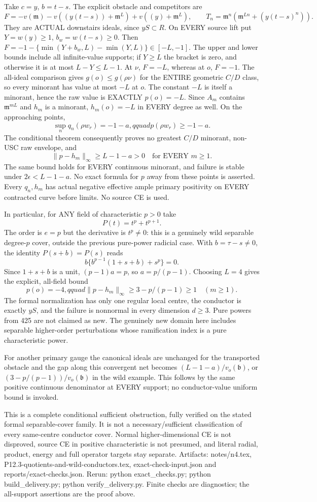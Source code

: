 Take $c=y$, $b=t-s$. The explicit obstacle and competitors are
\[
 F=-v(\mathfrak m)-v((y(t-s))+\mathfrak m^L)
       +v((y)+\mathfrak m^L),
 \qquad T_n=\mathfrak m^n(\mathfrak m^{Ln}+(y(t-s)^n)).
\]
They are ACTUAL downstairs ideals, since $yS\subset R$.
On EVERY source lift put $Y=w(y)\ge1$, $b_w=w(t-s)\ge0$.
Then $F=-1-\{\min(Y+b_w,L)-\min(Y,L)\}\in[-L,-1]$.
The upper and lower bounds include all infinite-value supports; if
$Y\ge L$ the bracket is zero, and otherwise it is at most $L-Y\le L-1$.
At $\nu$, $F=-L$, whereas at $o$, $F=-1$.
The all-ideal comparison gives $g(o)\le g(\rho\nu)$ for the ENTIRE
geometric $C/D$ class, so every minorant has value at most $-L$ at $o$.
The constant $-L$ is itself a minorant, hence the raw value is EXACTLY
$p(o)=-L$. Since $A_m$ contains $\mathfrak m^{mL}$ and $h_m$ is a minorant,
$h_m(o)=-L$ in EVERY degree as well. On the approaching points,
\[
 \sup_n q_n(\rho w_r)=-1-a,qquad p(\rho w_r)\ge-1-a.
\]
The conditional theorem consequently proves no greatest $C/D$ minorant,
non-USC raw envelope, and
\[
 \|p-h_m\|_\infty\ge L-1-a>0\quad\text{for EVERY }m\ge1.
\]
The same bound holds for EVERY continuous minorant, and failure is stable
under $2\epsilon<L-1-a$. No exact formula for $p$ away from these points
is asserted. Every $q_n,h_m$ has actual negative effective ample primary
positivity on EVERY contracted curve before limits. No source CE is used.

In particular, for ANY field of characteristic $p>0$ take
\[
 P(t)=t^p+t^{p+1}.
\]
The order is $e=p$ but the derivative is $t^p\ne0$: this is a genuinely
wild separable degree-$p$ cover, outside the previous pure-power radicial
case. With $b=\tau-s\ne0$, the identity $P(s+b)=P(s)$ reads
\[
 b\{b^{p-1}(1+s+b)+s^p\}=0.
\]
Since $1+s+b$ is a unit, $(p-1)a=p$, so $a=p/(p-1)$.
Choosing $L=4$ gives the explicit, all-field bound
\[
 p(o)=-4,qquad
 \|p-h_m\|_\infty\ge 3-p/(p-1)\ge1\quad(m\ge1).
\]
The formal normalization has only one regular local centre, the conductor
is exactly $yS$, and the failure is nonnormal in every dimension $d\ge3$.
Pure powers from 425 are not claimed as new. The genuinely new domain
here includes separable higher-order perturbations whose ramification
index is a pure characteristic power.

For another primary gauge the canonical ideals are unchanged for the
transported obstacle and the gap along this convergent net becomes
$(L-1-a)/v_o(\mathfrak b)$, or $(3-p/(p-1))/v_o(\mathfrak b)$ in the
wild example. This follows by the same positive continuous denominator
at EVERY support; no conductor-value uniform bound is invoked.

This is a complete conditional sufficient obstruction, fully verified on
the stated formal separable-cover family. It is not a necessary/sufficient
classification of every same-centre conductor cover. Normal higher-dimensional
CE is not disproved, source CE in positive characteristic is not presumed,
and literal radial, product, energy and full operator targets stay separate.
Artifacts: notes/n4.tex, P12.3-quotients-and-wild-conductors.tex,
exact-check-input.json and reports/exact-checks.json. Rerun:
python exact\_checks.py; python build\_delivery.py; python verify\_delivery.py.
Finite checks are diagnostics; the all-support assertions are the proof above.
